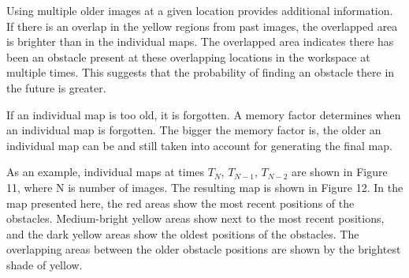 \documentclass[twocolumn,10pt]{asme2e}
\begin{document}
Using multiple older images at a given location provides additional information. If there is an overlap in the yellow regions from past images, the overlapped area is brighter than in the individual maps. The overlapped area indicates there has been an obstacle present at these overlapping locations in the workspace at multiple times. This suggests that the probability of finding an obstacle there in the future is greater.

If an individual map is too old, it is forgotten. A memory factor determines when an individual map is forgotten. The bigger the memory factor is, the older an individual map can be and still taken into account for generating the final map.



As an example, individual maps at times $T_{N}$, $T_{N-1}$, $T_{N-2}$  are shown in Figure 11, where N is number of images. The resulting map is shown in Figure 12. In the map presented here, the red areas show the most recent positions of the obstacles. Medium-bright yellow areas show next to the most recent positions, and the dark yellow areas show the oldest positions of the obstacles. The overlapping areas between the older obstacle positions are shown by the brightest shade of yellow.
\end{document}
